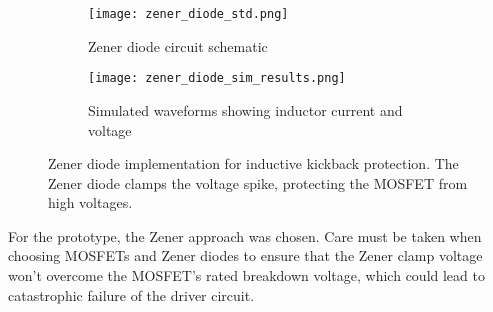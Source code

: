                 \begin{figure}[H]
                    \centering
                    \begin{subfigure}{0.25\textwidth}
                        \centering
                        \texttt{[image: zener\_diode\_std.png]}
                        \caption{Zener diode circuit schematic}
                        \label{fig:zener_circuit}
                    \end{subfigure}
                    \hfill
                    \begin{subfigure}{0.7\textwidth}
                        \centering
                        \texttt{[image: zener\_diode\_sim\_results.png]}
                        \caption{Simulated waveforms showing inductor current and voltage}
                        \label{fig:zener_waveform}
                    \end{subfigure}
                    \caption{Zener diode implementation for inductive kickback protection. The Zener diode clamps the voltage spike, protecting the MOSFET from high voltages.}
                    \label{fig:zener_combined}
                \end{figure}

                For the prototype, the Zener approach was chosen. Care must be taken when choosing MOSFETs and Zener diodes to ensure that the Zener clamp voltage won't overcome the MOSFET's rated breakdown voltage, which could lead to catastrophic failure of the driver circuit.


